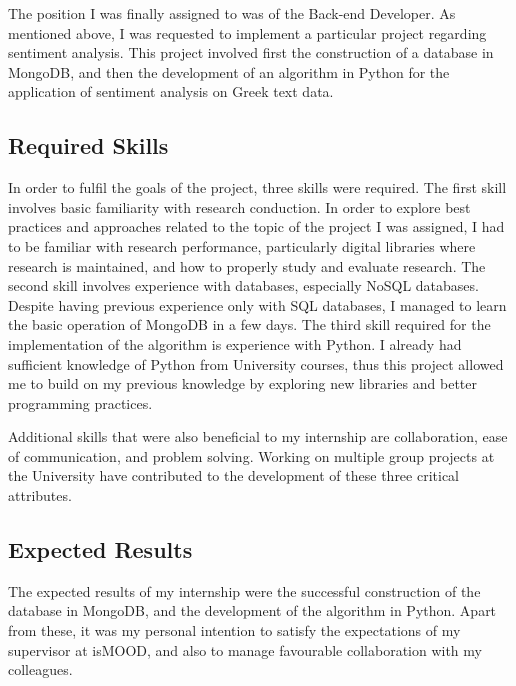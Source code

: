 The position I was finally assigned to was of the Back-end Developer.
As mentioned above, I was requested
to implement a particular project regarding sentiment analysis.
This project involved first the construction 
of a database in MongoDB,
and then the development of an algorithm in Python
for the application of sentiment analysis on Greek text data.

\subsection{Required Skills}
\label{subsec:skills}

In order to fulfil the goals of the project,
three skills were required.
The first skill involves basic familiarity with research conduction.
In order to explore best practices and approaches
related to the topic of the project I was assigned,
I had to be familiar with research performance,
particularly digital libraries where research is maintained,
and how to properly study and evaluate research.
The second skill involves experience with databases,
especially NoSQL databases.
Despite having previous experience only with SQL databases,
I managed to learn the basic operation of MongoDB in a few days.
The third skill required for the implementation of the algorithm
is experience with Python.
I already had sufficient knowledge of Python
from University courses,
thus this project allowed me to build on my previous knowledge
by exploring new libraries and better programming practices.

Additional skills that were also beneficial to my internship
are collaboration, ease of communication, and problem solving.
Working on multiple group projects at the University
have contributed to the development of these three critical attributes.

\subsection{Expected Results}
\label{subsec:results}

The expected results of my internship were
the successful construction of the database in MongoDB,
and the development of the algorithm in Python.
Apart from these, it was my personal intention
to satisfy the expectations of my supervisor at isMOOD,
and also to manage favourable collaboration with my colleagues.
